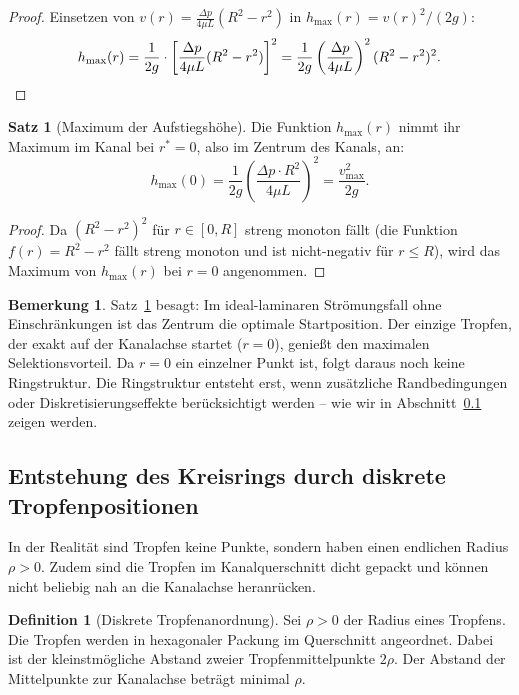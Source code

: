 ﻿\documentclass[a4paper,12pt]{article}
\theoremstyle{definition}
\newtheorem{definition}{Definition}
\newtheorem{satz}{Satz}
\newtheorem{bemerkung}{Bemerkung}
\begin{document}
\begin{proof}
    Einsetzen von $v(r) = \frac{\Delta p}{4\mu L}(R^2 - r^2)$ in $h_{\max}(r) = v(r)^2/(2g)$:
    \[
    h_{\max}(r) = \frac{1}{2g} \cdot \left[\frac{\Delta p}{4\mu L}(R^2 - r^2)\right]^2
    = \frac{1}{2g}\left(\frac{\Delta p}{4\mu L}\right)^2(R^2 - r^2)^2. \qedhere
    \]
\end{proof}

\begin{satz}[Maximum der Aufstiegshöhe]
\label{satz:maximum}
    Die Funktion $h_{\max}(r)$ nimmt ihr Maximum im Kanal bei $r^* = 0$, also im Zentrum
    des Kanals, an:
    \[
    h_{\max}(0) = \frac{1}{2g}\left(\frac{\Delta p \cdot R^2}{4\mu L}\right)^2 = \frac{v_{\max}^2}{2g}.
    \]
\end{satz}

\begin{proof}
    Da $(R^2 - r^2)^2$ für $r \in [0, R]$ streng monoton fällt (die Funktion
    $f(r) = R^2 - r^2$ fällt streng monoton und ist nicht-negativ für $r \le R$),
    wird das Maximum von $h_{\max}(r)$ bei $r = 0$ angenommen. \qedhere
\end{proof}

\begin{bemerkung}
Satz~\ref{satz:maximum} besagt: Im ideal-laminaren Strömungsfall ohne Einschränkungen
ist das Zentrum die optimale Startposition. Der einzige Tropfen, der exakt auf der
Kanalachse startet ($r=0$), genießt den maximalen Selektionsvorteil.
Da $r=0$ ein einzelner Punkt ist, folgt daraus noch keine Ringstruktur.
Die Ringstruktur entsteht erst, wenn zusätzliche Randbedingungen oder
Diskretisierungseffekte berücksichtigt werden -- wie wir in Abschnitt~\ref{sec:ring}
zeigen werden.
\end{bemerkung}

\subsection{Entstehung des Kreisrings durch diskrete Tropfenpositionen}
\label{sec:ring}

In der Realität sind Tropfen keine Punkte, sondern haben einen endlichen Radius
$\rho > 0$. Zudem sind die Tropfen im Kanalquerschnitt dicht gepackt und können
nicht beliebig nah an die Kanalachse heranrücken.

\begin{definition}[Diskrete Tropfenanordnung]
    Sei $\rho > 0$ der Radius eines Tropfens. Die Tropfen werden in hexagonaler
    Packung im Querschnitt angeordnet. Dabei ist der kleinstmögliche Abstand zweier
    Tropfenmittelpunkte $2\rho$. Der Abstand der Mittelpunkte zur Kanalachse beträgt
    minimal $\rho$.
\end{definition}
\end{document}
